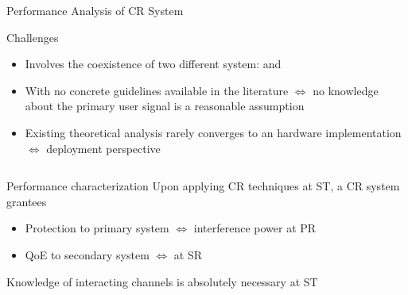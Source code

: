 \documentclass[16pt]{beamer}
\newcommand{\fs}[2]{\fontsize{#1 pt}{#2}\selectfont}
\begin{document}
\begin{frame}[t]{Performance Analysis of CR System}
	\vspace{-3mm}
	\fs{7}{8}
	\begin{block}{\scriptsize Challenges}
		\begin{itemize}
			\item Involves the coexistence of two different system: {\color{blue}{primary}} and {\color{red}{secondary}} 
			\item With no concrete guidelines available in the literature $\Leftrightarrow$ no knowledge about the primary user signal is a reasonable assumption
			\item Existing theoretical analysis rarely converges to an hardware implementation $\Leftrightarrow$ deployment perspective %
		\end{itemize}
	\end{block}
	\vspace{-1mm}
	\begin{columns}
		\begin{column}{0.37\columnwidth}
			\onslide<2->
			{
				\begin{block}{\scriptsize Performance characterization}
					Upon applying CR techniques at ST, a CR system grantees\begin{itemize}
						\item Protection to primary system $\Leftrightarrow$ interference power at PR 
						\item QoE to secondary system $\Leftrightarrow$ at SR 
					\end{itemize}
				\end{block}
			}
			\vspace{-1mm}
			{
				\begin{block}{}%
					Knowledge of interacting channels is absolutely necessary at ST 
				\end{block}
			}

\end{column}
\end{columns}
\end{frame}
\end{document}
